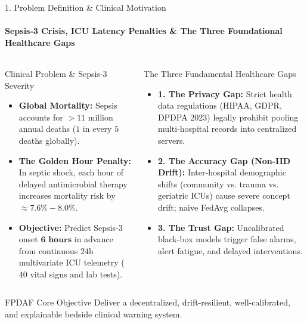 \documentclass[aspectratio=169, 10pt]{beamer}
\begin{document}
\begin{frame}{1. Problem Definition \& Clinical Motivation}
    \framesubtitle{Sepsis-3 Crisis, ICU Latency Penalties \& The Three Foundational Healthcare Gaps}
    \begin{columns}[T]
        \begin{block}{Clinical Problem \& Sepsis-3 Severity}
            \scriptsize
            \begin{itemize}
                \item \textbf{Global Mortality:} Sepsis accounts for $> 11$ million annual deaths ($1$ in every $5$ deaths globally).
                \item \textbf{The Golden Hour Penalty:} In septic shock, each hour of delayed antimicrobial therapy increases mortality risk by $\approx \mathbf{7.6\% - 8.0\%}$.
                \item \textbf{Objective:} Predict Sepsis-3 onset $\mathbf{6\text{ hours}}$ in advance from continuous $24\text{h}$ multivariate ICU telemetry ($40$ vital signs and lab tests).
            \end{itemize}
        \end{block}

        \begin{block}{The Three Fundamental Healthcare Gaps}
            \scriptsize
            \begin{itemize}
                \item \textbf{1. The Privacy Gap:} Strict health data regulations (HIPAA, GDPR, DPDPA 2023) legally prohibit pooling multi-hospital records into centralized servers.
                \item \textbf{2. The Accuracy Gap (Non-IID Drift):} Inter-hospital demographic shifts (community vs. trauma vs. geriatric ICUs) cause severe concept drift; naive FedAvg collapses.
                \item \textbf{3. The Trust Gap:} Uncalibrated black-box models trigger false alarms, alert fatigue, and delayed interventions.
            \end{itemize}
        \end{block}
    \end{columns}
    \vspace{0.1cm}
    \begin{alertblock}{\scriptsize FPDAF Core Objective}
        \scriptsize
        Deliver a decentralized, drift-resilient, well-calibrated, and explainable bedside clinical warning system.
    \end{alertblock}
\end{frame}
\end{document}
